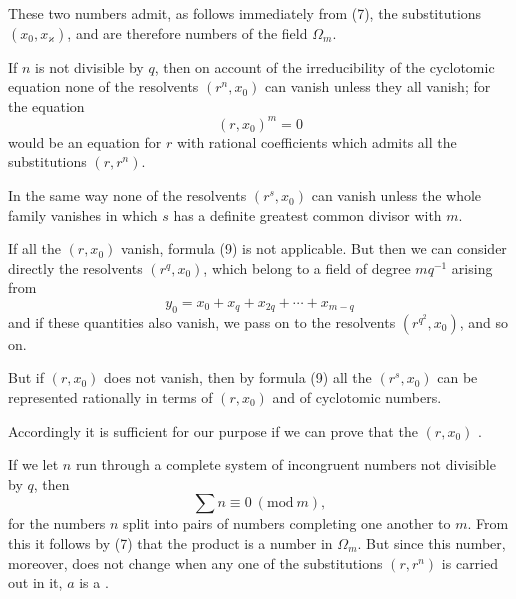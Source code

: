 
These two numbers admit, as follows immediately from (7), the substitutions $(x_0, x_\varkappa)$, and are therefore numbers of the field $\Omega_m$.

If $n$ is not divisible by $q$, then on account of the irreducibility of the cyclotomic equation none of the resolvents $(r^n, x_0)$ can vanish unless they all vanish; for the equation
\[
(r, x_0)^m = 0
\]
would be an equation for $r$ with rational coefficients which admits all the substitutions $(r, r^n)$.

In the same way none of the resolvents $(r^s, x_0)$ can vanish unless the whole family vanishes in which $s$ has a definite greatest common divisor with $m$.

If all the $(r, x_0)$ vanish, formula (9) is not applicable. But then we can consider directly the resolvents $(r^q, x_0)$, which belong to a field of degree $m q^{-1}$ arising from
\[
y_0 = x_0 + x_q + x_{2q} + \cdots + x_{m-q}
\]
and if these quantities also vanish, we pass on to the resolvents $(r^{q^2}, x_0)$, and so on.

But if $(r, x_0)$ does not vanish, then by formula (9) all the $(r^s, x_0)$ can be represented rationally in terms of $(r, x_0)$ and of cyclotomic numbers.

Accordingly it is sufficient for our purpose if we can prove that the  $(r, x_0)$ .

If we let $n$ run through a complete system of incongruent numbers not divisible by $q$, then
\[
\sum n \equiv 0 \ (\mathrm{mod}\ m),
\]
for the numbers $n$ split into pairs of numbers completing one another to $m$. From this it follows by (7) that the product
is a number in $\Omega_m$. But since this number, moreover, does not change when any one of the substitutions $(r, r^n)$ is carried out in it, $a$ is a .
